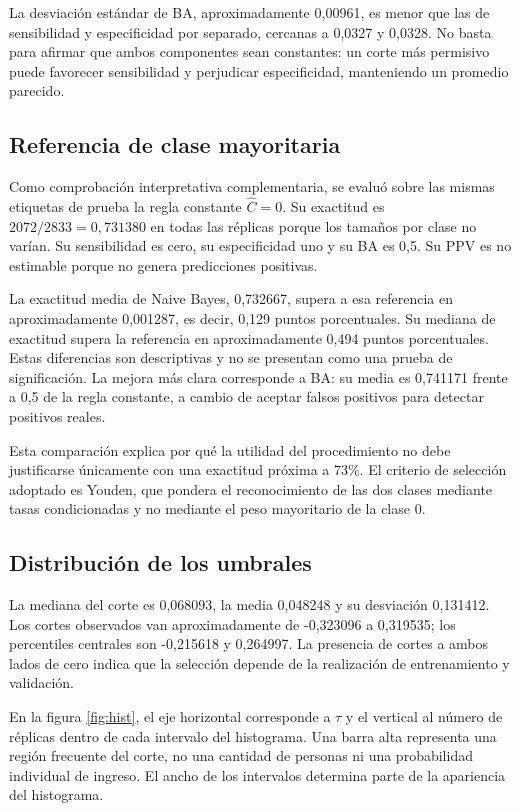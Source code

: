 \documentclass[11pt,a4paper]{article}
\begin{document}
La desviación estándar de BA, aproximadamente 0,00961, es menor que las de sensibilidad y especificidad por separado, cercanas a 0,0327 y 0,0328. No basta para afirmar que ambos componentes sean constantes: un corte más permisivo puede favorecer sensibilidad y perjudicar especificidad, manteniendo un promedio parecido.

\subsection{Referencia de clase mayoritaria}
Como comprobación interpretativa complementaria, se evaluó sobre las mismas etiquetas de prueba la regla constante $\widehat C=0$. Su exactitud es $2072/2833=0,731380$ en todas las réplicas porque los tamaños por clase no varían. Su sensibilidad es cero, su especificidad uno y su BA es 0,5. Su PPV es no estimable porque no genera predicciones positivas.

La exactitud media de Naive Bayes, 0,732667, supera a esa referencia en aproximadamente 0,001287, es decir, 0,129 puntos porcentuales. Su mediana de exactitud supera la referencia en aproximadamente 0,494 puntos porcentuales. Estas diferencias son descriptivas y no se presentan como una prueba de significación. La mejora más clara corresponde a BA: su media es 0,741171 frente a 0,5 de la regla constante, a cambio de aceptar falsos positivos para detectar positivos reales.

Esta comparación explica por qué la utilidad del procedimiento no debe justificarse únicamente con una exactitud próxima a 73\%. El criterio de selección adoptado es Youden, que pondera el reconocimiento de las dos clases mediante tasas condicionadas y no mediante el peso mayoritario de la clase 0.

\subsection{Distribución de los umbrales}
La mediana del corte es 0,068093, la media 0,048248 y su desviación 0,131412. Los cortes observados van aproximadamente de -0,323096 a 0,319535; los percentiles centrales son -0,215618 y 0,264997. La presencia de cortes a ambos lados de cero indica que la selección depende de la realización de entrenamiento y validación.

En la figura \ref{fig:hist}, el eje horizontal corresponde a $\tau$ y el vertical al número de réplicas dentro de cada intervalo del histograma. Una barra alta representa una región frecuente del corte, no una cantidad de personas ni una probabilidad individual de ingreso. El ancho de los intervalos determina parte de la apariencia del histograma.
\end{document}
